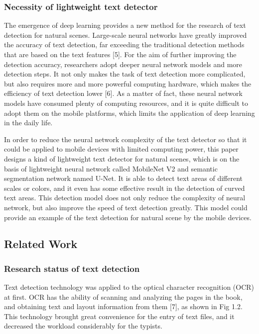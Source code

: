 \documentclass[22pt, UTF8]{article}
\numberwithin{figure}{section}
\numberwithin{table}{section}
\numberwithin{equation}{section} %
\begin{document}
\subsubsection{Necessity of lightweight text detector}

\setlength\parindent{2em} The emergence of deep learning provides a new method for the research of text detection for natural scenes. Large-scale neural networks have greatly improved the accuracy of text detection, far exceeding the traditional detection methods that are based on the text features [5]. For the aim of further improving the detection accuracy, researchers adopt deeper neural network models and more detection steps. It not only makes the task of text detection more complicated, but also requires more and more powerful computing hardware, which makes the efficiency of text detection lower [6]. As a matter of fact, these neural network models have consumed plenty of computing resources, and it is quite difficult to adopt them on the mobile platforms, which limits the application of deep learning in the daily life.

\setlength\parindent{2em} In order to reduce the neural network complexity of the text detector so that it could be applied to mobile devices with limited computing power, this paper designs a kind of lightweight text detector for natural scenes, which is on the basis of lightweight neural network called MobileNet V2 and semantic segmentation network named U-Net. It is able to detect text areas of different scales or colors, and it even has some effective result in the detection of curved text areas. This detection model does not only reduce the complexity of neural network, but also improve the speed of text detection greatly. This model could provide an example of the text detection for natural scene by the mobile devices.

\subsection{Related Work}

\subsubsection{Research status of text detection}

\setlength\parindent{2em} Text detection technology was applied to the optical character recognition (OCR) at first. OCR has the ability of scanning and analyzing the pages in the book, and obtaining text and layout information from them [7], as shown in Fig 1.2. This technology brought great convenience for the entry of text files, and it decreased the workload considerably for the typists. 
\end{document}

